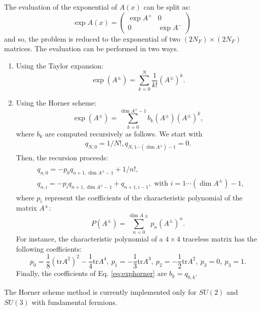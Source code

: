 \documentclass[12pt]{article}
\newcommand{\tr}{\mathrm{tr}}
\begin{document}
The evaluation of the exponential of $A(x)$ can be split as:
\begin{equation}
\exp A(x)  = \begin{pmatrix}
\exp A^+ & 0 \\
0& \exp A^-
\end{pmatrix}
\end{equation}
and so, the problem is reduced to the exponential of two $(2 N_F) \times  (2 N_F)$ matrices. The evaluation can be performed in two ways. 
\begin{enumerate}
\item Using the Taylor expansion:
\begin{equation}
\exp(A^\pm) = \sum_{k=0}^N  \frac{1}{k!} (A^\pm)^k.
\end{equation}
\item Using the Horner scheme:
\begin{equation}
\exp(A^\pm) = \sum_{k=0}^{\dim A^\pm -1} b_k(A^\pm)  (A^\pm)^k, \label{eq:exphorner}
\end{equation}
where $b_k$ are computed recursively as follows. We start with
\begin{align}
q_{N,0} = 1/N!, q_{N,1 \cdots (\dim A^\pm)-1} = 0.
\end{align}
Then, the recursion proceeds:
\begin{align}
\begin{split}
&q_{n,0} = - p_0 q_{n+1, \dim A^\pm-1}  + 1/n!, \\  &q_{n,i} = - p_i q_{n+1, \dim A^\pm-1}  + q_{n+1,i-1}, \text{ with } i=1 \cdots (\dim A^\pm) -1 , \label{eq:horner}
\end{split}
\end{align}
where $p_i$ represent the coefficients of the characteristic  polynomial of the matrix $A^\pm$:
\begin{equation}
P(A^\pm) = \sum_{n=0}^{\dim A\pm} p_n (A^\pm)^n.
\end{equation}
For instance, the characteristic polynomial of a $4 \times 4$ traceless matrix has the following coefficients:
\begin{equation}
p_0=\frac{1}{8 } \left(\tr A^2\right)^2 - \frac{1}{4} \tr A^4 ,\ p_1 = -\frac{1}{3}\tr  A^3, \ p_2= -\frac{1}{2}\tr  A^2, \ p_3=0, \ p_3=1.
\end{equation}
Finally, the coefficients of Eq. \ref{eq:exphorner} are $b_k  =q_{0,k} $. 
\end{enumerate}
The Horner scheme method is currently implemented only for $SU(2)$ and $SU(3)$ with fundamental fermions.
\end{document}
